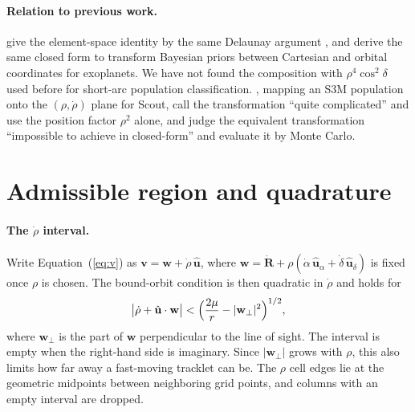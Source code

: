 \documentclass[linenumbers,twocolumn]{aastex701}
\begin{document}
\paragraph{Relation to previous work.}
\citet[their \S2.3]{peiris2003} give the element-space identity by the same
Delaunay argument \citep[see also][]{tremaine2020}, and \citet{masuda2026}
derive the same closed form to transform Bayesian priors between Cartesian and
orbital coordinates for exoplanets. We have not found the composition with
$\rho^4\cos^2\delta$ used before for short-arc population classification.
\citet[][\S3.2]{farnocchia2015}, mapping an S3M population onto the
$(\rho,\dot\rho)$ plane for Scout, call the transformation ``quite
complicated'' and use the position factor $\rho^2$ alone, and
\citet{hussein2014} judge the equivalent transformation ``impossible to
achieve in closed-form'' and evaluate it by Monte Carlo.

\section{Admissible region and quadrature}
\label{app:quadrature}

\paragraph{The $\dot\rho$ interval.}
Write Equation~(\ref{eq:v}) as $\mathbf{v}=\mathbf{w}+\dot\rho\,\hat{\mathbf{u}}$,
where $\mathbf{w}=\dot{\mathbf{R}}+\rho(\dot\alpha\,\hat{\mathbf{u}}_\alpha+
\dot\delta\,\hat{\mathbf{u}}_\delta)$ is fixed once $\rho$ is chosen. The
bound-orbit condition is then quadratic in $\dot\rho$ and holds for
\begin{equation}
\bigl|\dot\rho+\hat{\mathbf{u}}\cdot\mathbf{w}\bigr|
<\Bigl(\frac{2\mu}{r}-|\mathbf{w}_\perp|^2\Bigr)^{1/2},
\label{eq:rhodot}
\end{equation}
where $\mathbf{w}_\perp$ is the part of $\mathbf{w}$ perpendicular to the
line of sight. The interval is empty when the right-hand side is imaginary.
Since $|\mathbf{w}_\perp|$ grows with $\rho$, this also limits how far away a
fast-moving tracklet can be. The $\rho$ cell edges lie at the geometric
midpoints between neighboring grid points, and columns with an empty interval are
dropped.
\end{document}
